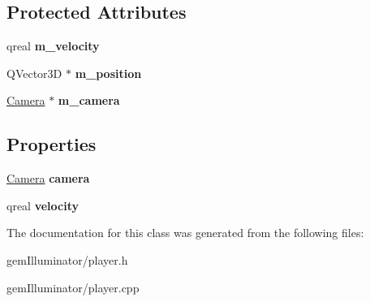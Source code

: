 \subsection*{Protected Attributes}
\begin{DoxyCompactItemize}
\item 
\hypertarget{class_player_a962e97e5fd3fe1c2db4e7e2066dbe61c}{}qreal {\bfseries m\+\_\+velocity}\label{class_player_a962e97e5fd3fe1c2db4e7e2066dbe61c}

\item 
\hypertarget{class_player_a9dc251e6a6d9a7f49c3f2ad5b64a7780}{}Q\+Vector3\+D $\ast$ {\bfseries m\+\_\+position}\label{class_player_a9dc251e6a6d9a7f49c3f2ad5b64a7780}

\item 
\hypertarget{class_player_a7721626a1c43592bfcb0c81a836f7aad}{}\hyperlink{class_camera}{Camera} $\ast$ {\bfseries m\+\_\+camera}\label{class_player_a7721626a1c43592bfcb0c81a836f7aad}

\end{DoxyCompactItemize}
\subsection*{Properties}
\begin{DoxyCompactItemize}
\item 
\hypertarget{class_player_a4e1ae30bdaec837b94451416a523d5cb}{}\hyperlink{class_camera}{Camera} {\bfseries camera}\label{class_player_a4e1ae30bdaec837b94451416a523d5cb}

\item 
\hypertarget{class_player_a53141a3791c456938945973cc78a2ea7}{}qreal {\bfseries velocity}\label{class_player_a53141a3791c456938945973cc78a2ea7}

\end{DoxyCompactItemize}


The documentation for this class was generated from the following files\+:\begin{DoxyCompactItemize}
\item 
gem\+Illuminator/player.\+h\item 
gem\+Illuminator/player.\+cpp\end{DoxyCompactItemize}
